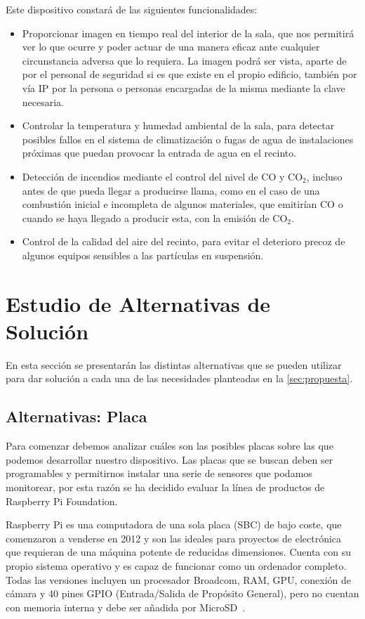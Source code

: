 Este dispositivo constará de las siguientes funcionalidades:
\begin{itemize}
	\item Proporcionar imagen en tiempo real del interior de la sala, que nos permitirá ver lo que ocurre y poder actuar de una manera eficaz ante cualquier circunstancia adversa que lo requiera. La imagen podrá ser vista, aparte de por el personal de seguridad si es que existe en el propio edificio, también por vía IP por la persona o personas encargadas de la misma mediante la clave necesaria.
	\item Controlar la temperatura y humedad ambiental de la sala, para detectar posibles fallos en el sistema de climatización o fugas de agua de instalaciones próximas que puedan provocar la entrada de agua en el recinto.
	\item Detección de incendios mediante el control del nivel de CO y CO$_2$, incluso antes de que pueda llegar a producirse llama, como en el caso de una combustión inicial e incompleta de algunos materiales, que emitirían CO o cuando se haya llegado a producir esta, con la emisión de CO$_2$.
	\item Control de la calidad del aire del recinto, para evitar el deterioro precoz de algunos equipos sensibles a las partículas en suspensión.
\end{itemize}

\section{Estudio de Alternativas de Solución}\label{sec:estudio-de-alternativas-de-solución}
En esta sección se presentarán las distintas alternativas que se pueden utilizar para dar solución a cada una de las necesidades planteadas en la \autoref{sec:propuesta}.

\subsection{Alternativas: Placa}\label{subsec:altPlacas}
Para comenzar debemos analizar cuáles son las posibles placas sobre las que podemos desarrollar nuestro dispositivo. Las placas que se buscan deben ser programables y permitirnos instalar una serie de sensores que podamos monitorear, por esta razón se ha decidido evaluar la línea de productos de Raspberry Pi Foundation.

\begin{figure}[H]
	{\def\svgwidth{.21\textwidth}
		}\label{fig:logoRaspberry}
\end{figure}
Raspberry Pi es una computadora de una sola placa (SBC) de bajo coste, que comenzaron a venderse en 2012 y son las ideales para proyectos de electrónica que requieran de una máquina potente de reducidas dimensiones. Cuenta con su propio sistema operativo y es capaz de funcionar como un ordenador completo. Todas las versiones incluyen un procesador Broadcom, RAM, GPU, conexión de cámara y 40 pines GPIO (Entrada/Salida de Propósito General), pero no cuentan con memoria interna y debe ser añadida por MicroSD~\cite{noauthor_raspberry_2021}.
\pagebreak

